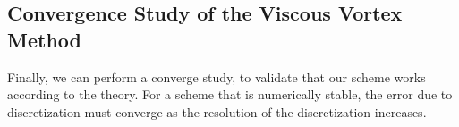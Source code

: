 

\subsection{Convergence Study of the Viscous Vortex Method}

Finally, we can perform a converge study, to validate that our scheme works according to the theory. For a scheme that is numerically stable, the error due to discretization must converge as the resolution of the discretization increases. 

